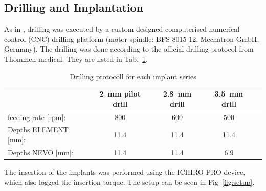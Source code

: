 \documentclass[12pt, a4paper, twoside]{report}
\begin{document}
\subsection{Drilling and Implantation}
%
%
As in \citet{wili_experimental_2021}, drilling was executed by a custom designed computerised numerical control (CNC) drilling platform (motor spindle: BFS-8015-12, Mechatron GmbH, Germany).
The drilling was done according to the official drilling protocol from Thommen medical.
They are listed in Tab.~\ref{tab:parameters}.
\begin{table}[H]
\centering
\begin{tabular}{|l|c|c|c|c|}
	\hline 
	& 2 mm pilot drill & 2.8 mm drill & 3.5 mm drill \\
	\hline
	feeding rate [rpm]: & 800 & 600 & 500 \\
	\hline
	Depths ELEMENT [mm]: & 11.4 & 11.4 & 11.4 \\
	\hline
	Depths NEVO [mm]: & 11.4 & 11.4 & 6.9 \\
	\hline
\end{tabular}
\caption{Drilling protocoll for each implant series}
\label{tab:parameters}
\end{table} 
%
%
The insertion of the implants was performed using the ICHIRO PRO device, which also logged the insertion torque.
The setup can be seen in Fig~\ref{fig:setup}.

\end{document}
